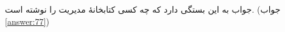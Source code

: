 \section{}
\paragraph{}\label{hint:32}
جواب به این بستگی دارد که چه کسی کتابخانهٔ مدیریت  را نوشته است. (جواب \ref{answer:77})